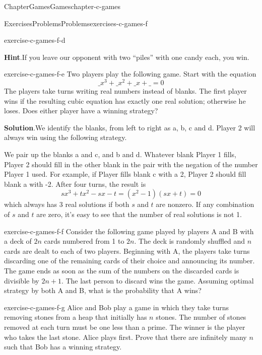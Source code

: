\documentclass[oneside,10pt,]{book}
\newcommand{\blocktitlefont}{\relax}
\numberwithin{equation}{section}
\begin{document}
\begin{chapterptx}{Chapter}{Games}{}{Games}{}{}{chapter-c-games}
\begin{exercises-section}{Exercises}{Problems}{}{Problems}{}{}{exercises-c-games-f}
\begin{divisionexercise}{3}{}{}{exercise-c-games-f-d}
\par\smallskip%
\noindent\textbf{\blocktitlefont Hint}.\hypertarget{hint-c-games-f-d-b}{}\quad{}If you leave our opponent with two ``piles'' with one candy each, you win.%
\end{divisionexercise}%
\begin{divisionexercise}{4}{}{}{exercise-c-games-f-e}%
Two players play the following game. Start with the equation%
\begin{equation*}
\_ x^3 + \_ x^2 + \_ x + \_= 0
\end{equation*}
The players take turns writing real numbers instead of blanks. The first player wins if the resulting cubic equation has exactly one real solution; otherwise he loses. Does either player have a winning strategy?%
\par\smallskip%
\noindent\textbf{\blocktitlefont Solution}.\hypertarget{solution-c-games-f-e-b}{}\quad{}We identify the blanks, from left to right as a, b, c and d.  Player 2 will always win using the following strategy.%
\par
We pair up the blanks  a and c, and b and d.   Whatever blank Player 1 fills, Player 2 should fill in the other blank in the pair with the negation of the number Player 1 used.  For example, if Player fills blank c with a 2, Player 2 should fill blank a with -2.  After four turns, the result is%
\begin{equation*}
s x^3 + t x^2 - s x - t =  (x^2-1)(s x + t) =0
\end{equation*}
which always has 3 real solutions if both \(s\)  and \(t\) are nonzero.   If any combination of  \(s\)  and \(t\) are zero, it's easy to see that the number of real solutions is not 1.%
\end{divisionexercise}%
\begin{divisionexercise}{5}{}{}{exercise-c-games-f-f}%
Consider the following game played by players A and B with a deck of \(2n\) cards numbered from 1 to \(2n\). The deck is randomly shuffled and \(n\) cards are dealt to each of two players. Beginning with A, the players take turns discarding one of the remaining cards of their choice and announcing its number. The game ends as soon as the sum of the numbers on the discarded cards is divisible by \(2n + 1\). The last person to discard wins the game. Assuming optimal strategy by both A and B, what is the probability that A wins?%
\end{divisionexercise}%
\begin{divisionexercise}{6}{}{}{exercise-c-games-f-g}%
Alice and Bob play a game in which they take turns removing stones from a heap that initially has \(n\) stones. The number of stones removed at each turn must be one less than a prime. The winner is the player who takes the last stone. Alice plays first. Prove that there are infinitely many \(n\) such that Bob has a winning strategy.%

\end{divisionexercise}
\end{exercises-section}
\end{chapterptx}
\end{document}
